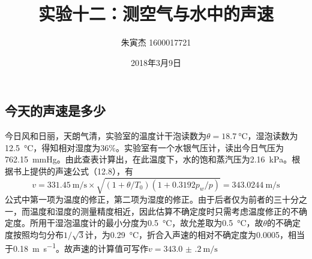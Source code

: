 \documentclass[UTF8]{ctexart}
\begin{document}
\title{实验十二：测空气与水中的声速}
\author{朱寅杰 1600017721}
\date{2018年3月9日}
\maketitle
\setcounter{section}{12}
\subsection{今天的声速是多少}
今日风和日丽，天朗气清，实验室的温度计干泡读数为$\theta=\SI{18.7}{\degreeCelsius}$，湿泡读数为\SI{12.5}{\degreeCelsius}，得知相对湿度为36\%。实验室有一个水银气压计，读出今日气压为\SI{762.15}{\mmHg}。由此查表计算出，在此温度下，水的饱和蒸汽压为\SI{2.16}{\kPa}。根据书上提供的声速公式（12.8），有
\[
v=\SI{331.45}{\meter\per\second}\times\sqrt{(1+\theta/T_0)(1+0.3192p_w/p)}=\SI{343.0244}{\meter\per\second}
\]
公式中第一项为温度的修正，第二项为湿度的修正。由于后者仅为前者的三十分之一，而温度和湿度的测量精度相近，因此估算不确定度时只需考虑温度修正的不确定度。所用干湿泡温度计的最小分度为\SI{0.5}{\degreeCelsius}，故允差取为\SI{0.5}{\degreeCelsius}，故$\theta$的不确定度按照均匀分布$1/\sqrt{3}$计，为\SI{.29}{\degreeCelsius}，折合入声速的相对不确定度为\num{.0005}，相当于\SI{.18}{\meter\per\second}。故声速的计算值可写作$v=\SI{343.0(2)}{\meter\per\second}$
\end{document}
